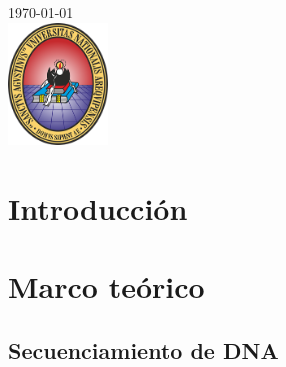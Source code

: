 \documentclass{article}
\begin{document}
\begin{titlepage}
	
	
	{\large \today}\\[2cm] %
	
	
	\includegraphics[width=100px, keepaspectratio]{img/unsa}\\[1cm] %
	
	
	\vfill %
	
\end{titlepage}	
	
	
	

	
	
\tableofcontents
\newpage	
	

	
\section{Introducción}

\section{Marco teórico}
	
\subsection{Secuenciamiento de DNA}
\end{document}
